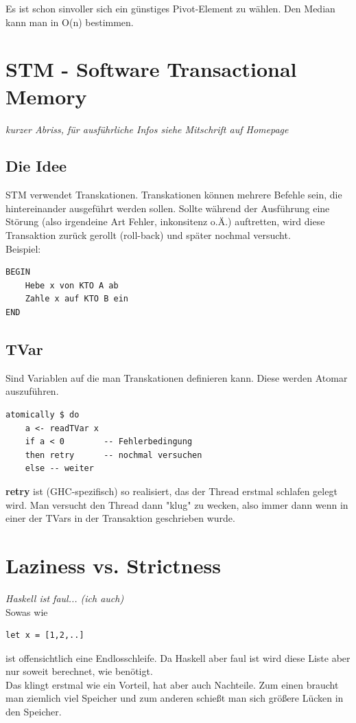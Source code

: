 \documentclass[ngerman,a4paper]{report}
\begin{document}
Es ist schon sinvoller sich ein günstiges Pivot-Element zu wählen. Den Median kann man in O(n) bestimmen.\\

\section{STM - Software Transactional Memory}
\emph{kurzer Abriss, für ausführliche Infos siehe Mitschrift auf Homepage}
\subsection{Die Idee}
STM verwendet Transkationen. Transkationen können mehrere Befehle sein, die hintereinander ausgeführt werden sollen. Sollte während der Ausführung eine Störung (also irgendeine Art Fehler, inkonsitenz o.Ä.) auftretten, wird diese Transaktion zurück gerollt (roll-back) und später nochmal versucht.\\
Beispiel:
\begin{lstlisting}
BEGIN
	Hebe x von KTO A ab
	Zahle x auf KTO B ein
END
\end{lstlisting}

\subsection{TVar}
Sind Variablen auf die man Transkationen definieren kann. Diese werden Atomar auszuführen.

\begin{lstlisting}
atomically $ do 
	a <- readTVar x
	if a < 0		-- Fehlerbedingung
	then retry		-- nochmal versuchen
	else -- weiter
\end{lstlisting}

\textbf{retry} ist (GHC-spezifisch) so realisiert, das der Thread erstmal schlafen gelegt wird. Man versucht den Thread dann "klug" zu wecken, also immer dann wenn in einer der TVars in der Transaktion geschrieben wurde.\\

\section{Laziness vs. Strictness}
\emph{Haskell ist faul... (ich auch)}\\
Sowas wie 
\begin{lstlisting}
let x = [1,2,..]
\end{lstlisting}
ist offensichtlich eine Endlosschleife. Da Haskell aber faul ist wird diese Liste aber nur soweit berechnet, wie benötigt.\\
Das klingt erstmal wie ein Vorteil, hat aber auch Nachteile. Zum einen braucht man ziemlich viel Speicher und zum anderen schießt man sich größere Lücken in den Speicher.\\
\end{document}
